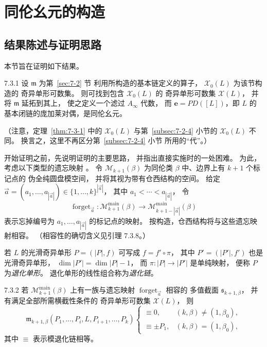 
\section{同伦幺元的构造}
\label{sec:7-3}
%

\subsection{结果陈述与证明思路}
\label{subsec:7-3-1}
本节旨在证明如下结果。

\begin{theorem}{7.3.1}\label{thm:7-3-1}
设 $\mathfrak m$ 为第~\ref{sec:7-2} 节
利用所构造的基本链定义的算子，
$\mathcal X_0(L)$ 为该节构造的
奇异单形可数集。
则可找到包含 $\mathcal X_0(L)$ 的
奇异单形可数集 $\mathcal X(L)$，
并将 $\mathfrak m$ 延拓到其上，
使之定义一个滤过 $A_\infty$ 代数，
而 $\mathbf e=PD([L])$，即 $L$ 的
基本闭链的庞加莱对偶，是同伦幺元。
\end{theorem}

（注意，定理~\ref{thm:7-3-1} 中的
$\mathcal X_0(L)$
与第~\ref{subsec:7-2-4} 小节的
$\mathcal X_0(L)$ 不同。
换言之，这里不再区分第~\ref{subsec:7-2-4} 小节
所用的“代”。）

开始证明之前，先说明证明的主要思路，
并指出直接实施时的一处困难。
为此，考虑以下类型的遗忘映射
。
令 $\mathcal M_{k+1}(\beta)$ 为同伦类
$\beta$ 中、边界上有 $k+1$ 个标记点的
伪全纯圆盘模空间，
并将其视为带有仓西结构的空间。
给定
$\vec a=(a_1,\ldots,a_{|\vec a|})
\in\{1,\ldots,k\}^{|\vec a|}$，
其中 $a_1<\cdots<a_{|\vec a|}$，
令
\[
\operatorname{forget}_{\vec a}\colon
\mathcal M^{\mathrm{main}}_{k+1}(\beta)
\longrightarrow
\mathcal M^{\mathrm{main}}_{k+1-|\vec a|}(\beta)
\]
表示忘掉编号为
$a_1,\ldots,a_{|\vec a|}$ 的标记点的映射。
按构造，仓西结构将与这些遗忘映射相容。
（相容性的确切含义见引理 7.3.8。）

若 $L$ 的光滑奇异单形
$P=(|P|,f)$ 可写成
$f=f'\circ\pi$，
其中 $P'=(|P'|,f')$ 也是光滑奇异单形，
$\dim|P'|=\dim|P|-1$，
而 $\pi\colon|P|\to|P'|$ 是单纯映射，
便称 $P$ 为\emph{退化单形}。
退化单形的线性组合称为\emph{退化链}。

\begin{lemma}{7.3.2}\label{lem:7-3-2}
若 $\mathcal M^{\mathrm{main}}_{k+1}(\beta)$
上有一族与遗忘映射
$\operatorname{forget}_{\vec a}$ 相容的
多值截面 $\mathfrak s_{k+1,\beta}$，
并有满足全部所需横截性条件的
奇异单形可数集 $\mathcal X(L)$，
则
\begin{equation}
\mathfrak m_{k+1,\beta}
(P_1,\ldots,P_i,L,P_{i+1},\ldots,P_k)
\begin{cases}
\equiv 0,
  &(k,\beta)\ne(1,\beta_0),\\
\equiv\pm P_1,
  &(k,\beta)=(1,\beta_0),
\end{cases}
\tag{7.3.3}\label{eq:7-3-3}
\end{equation}
其中 $\equiv$ 表示模退化链相等。
\end{lemma}

